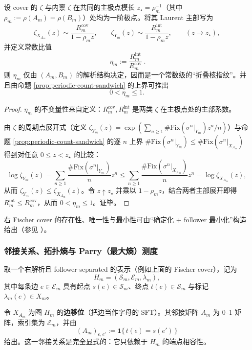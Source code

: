 

\begin{proposition}[主极点留数比作为常数级核指纹]\label{prop:Ym-zeta-residue-ratio}
设 cover 的 \(\zeta\) 与内禀 \(\zeta\) 在共同的主极点模长 \(z_\star=\rho_m^{-1}\)（其中 \(\rho_m:=\rho(A_m)=\rho(B_m)\)）处均为一阶极点。将其 Laurent 主部写为
\[
\zeta_{X_{A_m}}(z)\sim \frac{R_m^{\mathrm{cov}}}{1-\rho_m z},
\qquad
\zeta_{Y_m}(z)\sim \frac{R_m^{\mathrm{int}}}{1-\rho_m z},
\qquad (z\to z_\star),
\]
并定义常数比值
\[
\boxed{\ \eta_m:=\frac{R_m^{\mathrm{int}}}{R_m^{\mathrm{cov}}}\ }.
\]
则 \(\eta_m\) 仅由 \((A_m,B_m)\) 的解析结构决定，因而是一个常数级的“折叠核指纹”。并且由命题 \ref{prop:periodic-count-sandwich} 的上界可推出
\[
0<\eta_m\le 1.
\]
\end{proposition}
\begin{proof}
\(\eta_m\) 的不变量性来自定义：\(R_m^{\mathrm{cov}},R_m^{\mathrm{int}}\) 是两类 \(\zeta\) 在主极点处的主部系数。

由 \(\zeta\) 的周期点展开式（定义 \(\zeta_{Y_m}(z)=\exp(\sum_{n\ge 1}\#\mathrm{Fix}(\sigma^n|_{Y_m})z^n/n)\)）与命题 \ref{prop:periodic-count-sandwich} 的逐 \(n\) 上界
\(\#\mathrm{Fix}(\sigma^n|_{Y_m})\le \#\mathrm{Fix}(\sigma^n|_{X_{A_m}})\)
得到对任意 \(0\le z<z_\star\) 的比较：
\[
\log\zeta_{Y_m}(z)
=\sum_{n\ge 1}\frac{\#\mathrm{Fix}(\sigma^n|_{Y_m})}{n}z^n
\le
\sum_{n\ge 1}\frac{\#\mathrm{Fix}(\sigma^n|_{X_{A_m}})}{n}z^n
=\log\zeta_{X_{A_m}}(z),
\]
从而 \(\zeta_{Y_m}(z)\le \zeta_{X_{A_m}}(z)\)。令 \(z\uparrow z_\star\) 并乘以 \(1-\rho_m z\)，结合两者主部展开即得 \(R_m^{\mathrm{int}}\le R_m^{\mathrm{cov}}\)，从而 \(0<\eta_m\le 1\)。证毕。
\end{proof}

右 Fischer cover 的存在性、唯一性与最小性可由“确定化 + follower 最小化”构造给出（参见 \cite{LindMarcus1995,Kitchens1998SymbolicDynamics}）。

\subsubsection{邻接关系、拓扑熵与 Parry（最大熵）测度}
取一个右解析且 follower-separated 的表示（例如上面的 Fischer cover），记为
\[
H_m=(\mathcal{S}_m,\mathcal{E}_m,\lambda_m),
\]
其中每条边 $e\in\mathcal{E}_m$ 具有起点 $s(e)\in\mathcal{S}_m$、终点 $t(e)\in\mathcal{S}_m$ 与标记 $\lambda_m(e)\in X_m$。

\begin{definition}\label{def:Phi_m-adjacency}
令 $X_{A_m}$ 为图 $H_m$ 的\textbf{边移位}（把边当作字母的 SFT）。其邻接矩阵 $A_m$ 为 $0$--$1$ 矩阵，索引集为 $\mathcal{E}_m$，并由
\[
(A_m)_{e,e'}:=\mathbf{1}\{\,t(e)=s(e')\,\}
\]
给出。这一邻接关系是完全显式的：它只依赖于 $H_m$ 的端点相容性。
\end{definition}

